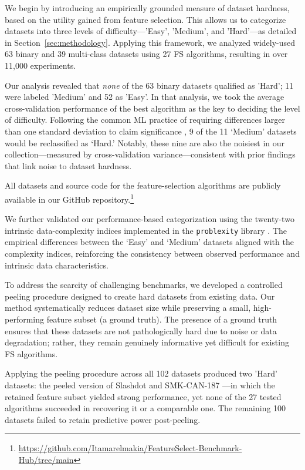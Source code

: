 \documentclass[preprint,12pt,authoryear]{elsarticle}
\begin{document}
\vspace{1mm}


We begin by introducing an empirically grounded measure of dataset hardness, based on the utility gained from feature selection. This allows us to categorize datasets into three levels of difficulty—'Easy', 'Medium', and 'Hard'—as detailed in Section~\ref{sec:methodology}. Applying this framework, we analyzed widely-used 63 binary and 39 multi-class datasets using 27 FS algorithms, resulting in over 11,000 experiments.


Our analysis revealed that \emph{none} of the 63 binary datasets qualified as 'Hard'; 11 were labeled 'Medium' and 52 as 'Easy'. In that analysis, we took the average cross-validation performance of the best algorithm as the key to deciding the level of difficulty.  Following the common ML practice of requiring differences larger than one standard deviation to claim significance \cite{kohavi1995study}, 9 of the 11 ‘Medium’ datasets would be reclassified as ‘Hard.’ Notably, these nine are also the noisiest in our collection—measured by cross-validation variance—consistent with prior findings that link noise to dataset hardness.

All datasets and source code for the feature-selection algorithms are publicly available in our GitHub repository.\footnote{\url{https://github.com/Itamarelmakia/FeatureSelect-Benchmark-Hub/tree/main}}


We further validated our performance-based categorization using the twenty-two intrinsic data-complexity indices implemented in the \texttt{problexity} library \cite{problexity}. The empirical differences between the ‘Easy’ and ‘Medium’ datasets aligned with the complexity indices, reinforcing the consistency between observed performance and intrinsic data characteristics.



\vspace{1mm}

To address the scarcity of challenging benchmarks, we developed a controlled peeling procedure designed to create hard datasets from existing data. Our method systematically reduces dataset size while preserving a small, high-performing feature subset (a ground truth). The presence of a ground truth ensures that these datasets are not pathologically hard due to noise or data degradation; rather, they remain genuinely informative yet difficult for existing FS algorithms. 

Applying the peeling procedure across all 102 datasets produced two 'Hard' datasets: the peeled version of Slashdot \cite{read2011classifier} and SMK-CAN-187 \cite{li2017feature}—in which the retained feature subset yielded strong performance, yet none of the 27 tested algorithms succeeded in recovering it or a comparable one. The remaining 100 datasets failed to retain predictive power post-peeling.
\end{document}
